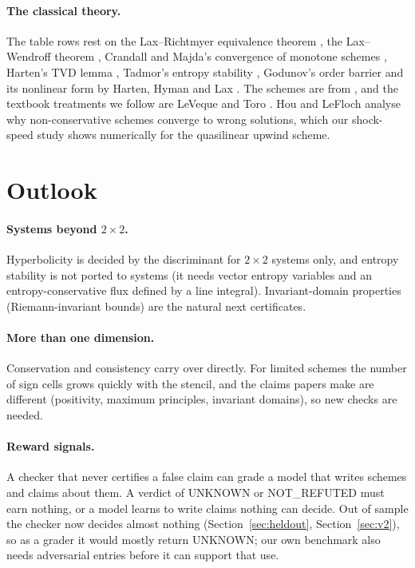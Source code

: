 \documentclass[11pt,a4paper]{article}
\newcommand{\NR}{\textsf{NOT\_REFUTED}}
\newcommand{\U}{\textsf{UNKNOWN}}
\begin{document}
\paragraph{The classical theory.} The table rows rest on the Lax--Richtmyer equivalence theorem
\cite{laxrichtmyer1956}, the Lax--Wendroff theorem \cite{laxwendroff1960}, Crandall and Majda's
convergence of monotone schemes \cite{crandallmajda1980}, Harten's TVD lemma \cite{harten1983},
Tadmor's entropy stability \cite{tadmor1987,tadmor2003}, Godunov's order barrier \cite{godunov1959}
and its nonlinear form by Harten, Hyman and Lax \cite{hartenhymanlax1976}. The schemes are from
\cite{rusanov1961,engquistosher1981,roe1981,sweby1984}, and the textbook treatments we follow are
LeVeque \cite{leveque2002} and Toro \cite{toro2009}. Hou and LeFloch \cite{houlefloch1994} analyse why
non-conservative schemes converge to wrong solutions, which our shock-speed study shows numerically
for the quasilinear upwind scheme.

\section{Outlook}\label{sec:outlook}

\paragraph{Systems beyond $2\times2$.} Hyperbolicity is decided by the discriminant for $2\times2$
systems only, and entropy stability is not ported to systems (it needs vector entropy variables and an
entropy-conservative flux defined by a line integral). Invariant-domain properties (Riemann-invariant
bounds) are the natural next certificates.

\paragraph{More than one dimension.} Conservation and consistency carry over directly. For limited
schemes the number of sign cells grows quickly with the stencil, and the claims papers make are
different (positivity, maximum principles, invariant domains), so new checks are needed.

\paragraph{Reward signals.} A checker that never certifies a false claim can grade a model that writes
schemes and claims about them. A verdict of \U{} or \NR{} must earn nothing, or a model learns to write
claims nothing can decide. Out of sample the checker now decides almost nothing
(Section~\ref{sec:heldout}, Section~\ref{sec:v2}), so as a grader it would mostly return \U; our own
benchmark also needs adversarial entries before it can support that use.
\end{document}
